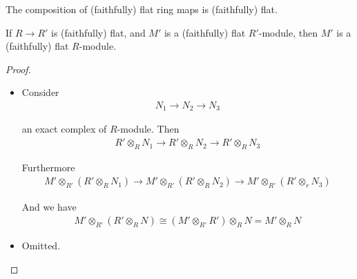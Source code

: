 \documentclass[Total.tex]{subfiles}
\begin{document}
				\begin{lemma}
					The composition of (faithfully) flat ring maps is (faithfully) flat.
					
					If $R\rightarrow R'$ is (faithfully) flat, and $M'$ is a (faithfully) flat $R'$-module, then $M'$ is a (faithfully) flat $R$-module.
				\end{lemma}
				\begin{proof}
					\begin{itemize}
						\item Consider
						\begin{gather*}
							N_1\rightarrow N_2\rightarrow N_3
						\end{gather*}
						
						an exact complex of $R$-module. Then
						\begin{gather*}
							R'\otimes_R N_1\rightarrow R'\otimes_R N_2\rightarrow R'\otimes_R N_3
						\end{gather*}
						
						Furthermore
						\begin{gather*}
							M'\otimes_{R'}(R'\otimes_R N_1)\rightarrow M'\otimes_{R'}(R'\otimes_R N_2)\rightarrow M'\otimes_{R'}(R'\otimes_r N_3)
						\end{gather*}
						
						And we have
						\begin{gather*}
							M'\otimes_{R'}(R'\otimes_R N)\cong (M'\otimes_{R'} R')\otimes_R N=M'\otimes_R N
						\end{gather*}
						\item Omitted.
					\end{itemize}
				\end{proof}
				
\end{document}
